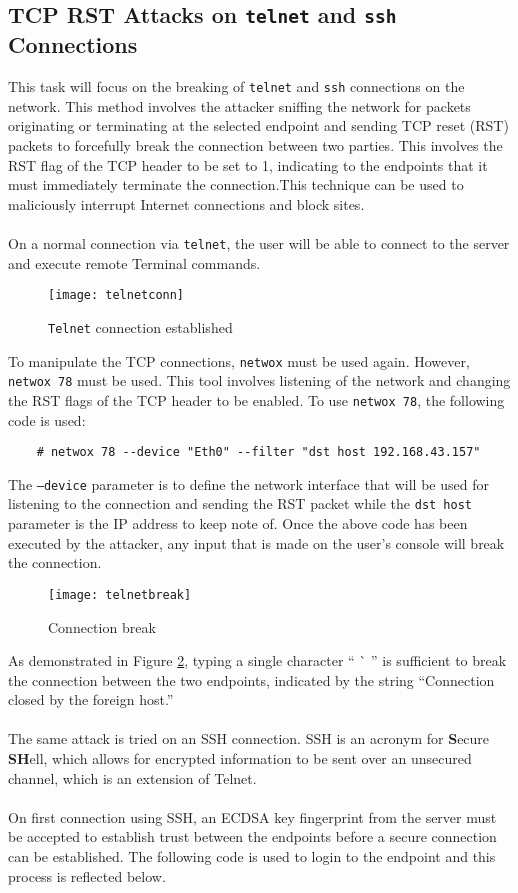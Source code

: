 \documentclass[a4paper,12pt]{article}
\begin{document}
	\subsection{TCP RST Attacks on \texttt{telnet} and \texttt{ssh} Connections}	
	This task will focus on the breaking of \texttt{telnet} and \texttt{ssh} connections on the network. This method involves the attacker sniffing the network for packets originating or terminating at the selected endpoint and sending TCP reset (RST) packets to forcefully break the connection between two parties. This involves the RST flag of the TCP header to be set to 1, indicating to the endpoints that it must immediately terminate the connection.This technique can be used to maliciously interrupt Internet connections and block sites.\\\\On a normal connection via \texttt{telnet}, the user will be able to connect to the server and execute remote Terminal commands.
	\begin{figure}[H]
		\centering
		\texttt{[image: telnetconn]}
		\caption{\texttt{Telnet} connection established}
		\label{fig:telnetconn2}
	\end{figure}
	\noindent To manipulate the TCP connections, \texttt{netwox} must be used again. However, \texttt{netwox 78} must be used. This tool involves listening of the network and changing the RST flags of the TCP header to be enabled. To use \texttt{netwox 78}, the following code is used:
	\begin{verbatim}
	# netwox 78 --device "Eth0" --filter "dst host 192.168.43.157"
	\end{verbatim}
	The \texttt{--device} parameter is to define the network interface that will be used for listening to the connection and sending the RST packet while the \texttt{dst host} parameter is the IP address to keep note of. Once the above code has been executed by the attacker, any input that is made on the user's console will break the connection.
\begin{figure}[H]
	\centering
	\texttt{[image: telnetbreak]}
	\caption{Connection break}
	\label{fig:telnetbreak}
\end{figure}
\noindent As demonstrated in Figure \ref{fig:telnetbreak}, typing a single character `` \`{} '' is sufficient to break the connection between the two endpoints, indicated by the string ``Connection closed by the foreign host.''\\\\The same attack is tried on an SSH connection. SSH is an acronym for \textbf{S}ecure \textbf{SH}ell, which allows for encrypted information to be sent over an unsecured channel, which is an extension of Telnet.\\\\On first connection using SSH, an ECDSA key fingerprint from the server must be accepted to establish trust between the endpoints before a secure connection can be established. The following code is used to login to the endpoint and this process is reflected below.
\end{document}
